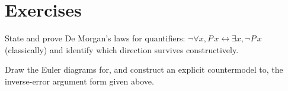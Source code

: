 \section{Exercises}

\begin{exercise}
State and prove De Morgan's laws for quantifiers:
$\lnot \forall x, P\,x \leftrightarrow \exists x, \lnot P\,x$
(classically) and identify which direction survives constructively.
\end{exercise}

\begin{exercise}
Draw the Euler diagrams for, and construct an explicit countermodel
to, the inverse-error argument form given above.
\end{exercise}

